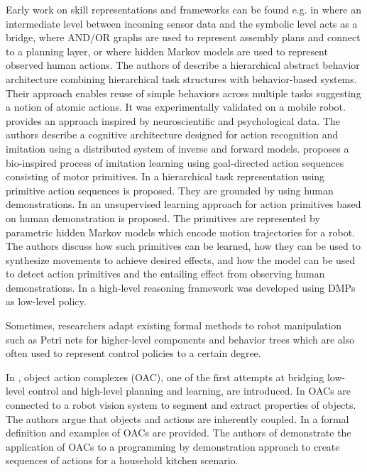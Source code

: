 Early work on skill representations and frameworks can be found e.g. in \cite{Chella.1999} where an intermediate level between incoming sensor data and the symbolic level acts as a bridge, \cite{HomemdeMello.1990,Cao.1998} where AND/OR graphs are used to represent assembly plans and connect to a planning layer, or \cite{Yang.1997} where hidden Markov models are used to represent observed human actions.
The authors of \cite{Nicolescu.2002} describe a hierarchical abstract behavior architecture combining hierarchical task structures with behavior-based systems.
Their approach enables reuse of simple behaviors across multiple tasks suggesting a notion of atomic actions.
It was experimentally validated on a mobile robot.
\cite{Demiris.2003} provides an approach inspired by neuroscientific and psychological data.
The authors describe a cognitive architecture designed for action recognition and imitation using a distributed system of inverse and forward models.
\cite{Erlhagen.2006} proposes a bio-inspired process of imitation learning using goal-directed action sequences consisting of motor primitives.
In \cite{Zoliner.2005} a hierarchical task representation using primitive action sequences is proposed.
They are grounded by using human demonstrations.
In \cite{Kruger.2010} an unsupervised learning approach for action primitives based on human demonstration is proposed.
The primitives are represented by parametric hidden Markov models which encode motion trajectories for a robot.
The authors discuss how such primitives can be learned, how they can be used to synthesize movements to achieve desired effects, and how the model can be used to detect action primitives and the entailing effect from observing human demonstrations.
In \cite{Cohen.2010} a high-level reasoning framework was developed using DMPs as low-level policy.

Sometimes, researchers adapt existing formal methods to robot manipulation such as Petri nets for higher-level components \cite{Cao.1994,Lima.1998,Costelha.2007,Costelha.2012} and behavior trees \cite{Marzinotto.2014,Rovida.2017,Banerjee.2018,French.2019} which are also often used to represent control policies to a certain degree.

In \cite{Geib.2006}, object action complexes (OAC), one of the first attempts at bridging low-level control and high-level planning and learning, are introduced. In \cite{Kraft.2008,Huebner.2008} OACs are connected to a robot vision system to segment and extract properties of objects. The authors argue that objects and actions are inherently coupled. In \cite{Kruger.2009,Worgotter.2009} a formal definition and examples of OACs are provided. The authors of \cite{Wachter.2013} demonstrate the application of OACs to a programming by demonstration approach to create sequences of actions for a household kitchen scenario.

